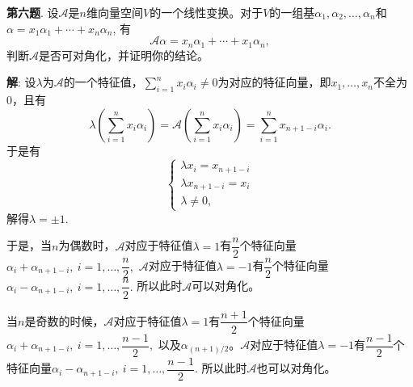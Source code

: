 \newpageorvspace


{\bf 第六题}. 设$\mathscr{A}$是$n$维向量空间$V$的一个线性变换。对于$V$的一组基$\alpha_1, \alpha_2, \ldots, \alpha_n$和$\alpha = x_1\alpha_1 + \cdots + x_n\alpha_n$, 有
$$\mathscr{A}\alpha = x_n\alpha_1 + \cdots + x_1\alpha_n,$$
判断$\mathscr{A}$是否可对角化，并证明你的结论。

{\bf 解}: 设$\lambda$为$\mathscr{A}$的一个特征值，$\sum\limits_{i=1}^n x_i \alpha_i \neq 0$为对应的特征向量，即$x_1,\ldots,x_n$不全为0，且有
$$\lambda(\sum\limits_{i=1}^n x_i \alpha_i) = \mathscr{A}(\sum\limits_{i=1}^n x_i \alpha_i) = \sum\limits_{i=1}^n x_{n+1-i} \alpha_i.$$
于是有
$$
\begin{cases}
\lambda x_i = x_{n+1-i} \\
\lambda x_{n+1-i} = x_i \\
\lambda \neq 0,
\end{cases}
$$
解得$\lambda = \pm 1$. 

于是，当$n$为偶数时，$\mathscr{A}$对应于特征值$\lambda = 1$有$\dfrac{n}{2}$个特征向量$\alpha_i + \alpha_{n+1-i}, ~ i = 1, \ldots, \dfrac{n}{2},$ $\mathscr{A}$对应于特征值$\lambda = -1$有$\dfrac{n}{2}$个特征向量$\alpha_i - \alpha_{n+1-i}, ~ i = 1, \ldots, \dfrac{n}{2}.$ 所以此时$\mathscr{A}$可以对角化。

当$n$是奇数的时候，$\mathscr{A}$对应于特征值$\lambda = 1$有$\dfrac{n+1}{2}$个特征向量$\alpha_i + \alpha_{n+1-i}, ~ i = 1, \ldots, \dfrac{n-1}{2},$ 以及$\alpha_{(n+1)/2}$。$\mathscr{A}$对应于特征值$\lambda = -1$有$\dfrac{n-1}{2}$个特征向量$\alpha_i - \alpha_{n+1-i}, ~ i = 1, \ldots, \dfrac{n-1}{2}.$ 所以此时$\mathscr{A}$也可以对角化。


